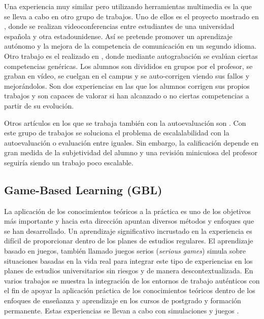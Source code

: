 Una experiencia muy similar pero utilizando herramientas multimedia es la que se lleva a cabo en otro grupo de trabajos. Uno de ellos es el proyecto mostrado en \cite{Martin-Cuadrado:2013}, donde se realizan videoconferencias entre estudiantes de una universidad española y otra estadounidense. Así se pretende promover un aprendizaje autónomo y la mejora de la competencia de comunicación en un segundo idioma. Otro trabajo es el realizado en \cite{Masip-Alvarez:2013}, donde mediante autograbación se evalúan ciertas competencias genéricas. Los alumnos son divididos en grupos por el profesor, se graban en vídeo, se cuelgan en el campus y se auto-corrigen viendo sus fallos y mejorándolos. Son dos experiencias en las que los alumnos corrigen sus propios trabajos y son capaces de valorar si han alcanzado o no ciertas competencias a partir de su evolución.

Otros artículos en los que se trabaja también con la autoevaluación son \cite{Colomo-Palacios:2013,Liao:2013,McMahon:2007,Murdoch-Eaton:2012,Chebil:2012,Cardona:2013}. Con este grupo de trabajos se soluciona el problema de escalalabilidad con la autoevaluación o evaluación entre iguales. Sin embargo, la calificación depende en gran medida de la subjetividad del alumno y una revisión minicuiosa del profesor seguiría siendo un trabajo poco escalable. 

\subsection{Game-Based Learning (GBL)} 
La aplicación de los conocimientos teóricos a la práctica es uno de los objetivos más importante y hacia esta dirección apuntan diversos métodos y enfoques que se han desarrollado. Un aprendizaje significativo incrustado en la experiencia es difícil de proporcionar dentro de los planes de estudios regulares. El aprendizaje basado en juegos, también llamado juegos serios (\emph{serious games}) simula sobre situaciones basadas en la vida real para integrar este tipo de experiencias en los planes de estudios universitarios sin riesgos y de manera descontextualizada. En varios trabajos se muestra la integración de los entornos de trabajo auténticos con el fin de apoyar la aplicación práctica de los conocimientos teóricos dentro de los enfoques de enseñanza y aprendizaje en los cursos de postgrado y formación permanente. Estas experiencias se llevan a cabo con simulaciones y juegos \cite{Petersen:2012,Borrajo:2010}.

